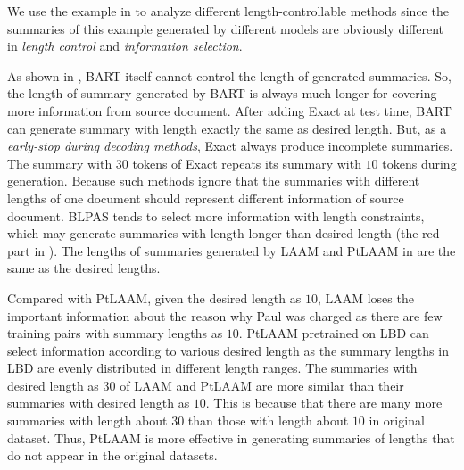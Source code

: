 We use the example in  to analyze different length-controllable methods since the summaries of this example generated by different models are obviously different in {\em length control} and {\em information selection}.

As shown in , BART itself cannot control the length of generated summaries.
So, the length of summary generated by BART is always much longer for covering more information from source document. 
After adding Exact at test time, BART can generate summary with length exactly the same as desired length. But, as a {\em early-stop during decoding methods}, Exact always produce incomplete summaries. The summary with $30$ tokens of Exact repeats its summary with $10$ tokens during generation. Because such methods ignore that the summaries with different lengths of one document should represent different information of source document. 
BLPAS tends to select more information with length constraints, which may generate summaries with length longer than desired length (the red part in ). 
The lengths of summaries generated by LAAM and PtLAAM in  are the same as the desired lengths. 

Compared with PtLAAM, given the desired length as $10$, LAAM loses the important information about the reason why Paul was charged as there are few training pairs with summary lengths as $10$. PtLAAM pretrained on LBD can select information according to various desired length as the summary lengths in LBD are evenly distributed in different length ranges. The summaries with desired length as $30$ of LAAM and PtLAAM are more similar than their summaries with desired length as $10$. 
This is because that there are many more summaries with length about $30$ than those with length about $10$ in original dataset. Thus, PtLAAM is more effective in generating summaries of lengths that do not appear in the original datasets.

